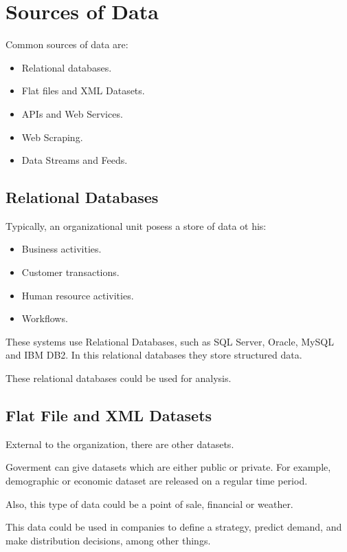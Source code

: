 \documentclass[../../ibm_data_analysis.tex]{subfiles}
\begin{document}
    \section{Sources of Data}

    Common sources of data are:
    \begin{itemize}
        \item Relational databases.
        \item Flat files and XML Datasets.
        \item APIs and Web Services.
        \item Web Scraping.
        \item Data Streams and Feeds.
    \end{itemize}

    \subsection{Relational Databases}

    Typically, an organizational unit posess a store of data ot his:
    \begin{itemize}
        \item Business activities.
        \item Customer transactions.
        \item Human resource activities.
        \item Workflows.
    \end{itemize}
    These systems use Relational Databases, such as SQL Server, Oracle, MySQL and IBM DB2. In this relational databases they store structured data.

    These relational databases could be used for analysis.

    \subsection{Flat File and XML Datasets}

    External to the organization, there are other datasets.

    \begin{exa}
        Goverment can give datasets which are either public or private. For example, demographic or economic dataset are released on a regular time period.
    \end{exa}

    Also, this type of data could be a point of sale, financial or weather.

    \begin{idea}
        This data could be used in companies to define a strategy, predict demand, and make distribution decisions, among other things.
    \end{idea}
\end{document}

